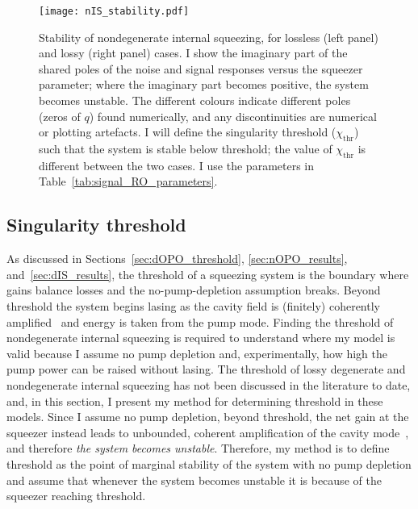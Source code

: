\begin{figure}[t]
    \centering
    \texttt{[image: nIS\_stability.pdf]}
    \caption{Stability of nondegenerate internal squeezing, for lossless (left panel) and lossy (right panel) cases. I show the imaginary part of the shared poles of the noise and signal responses versus the squeezer parameter; where the imaginary part becomes positive, the system becomes unstable. The different colours indicate different poles (zeros of $q$) found numerically, and any discontinuities are numerical or plotting artefacts. I will define the singularity threshold ($\chi_\text{thr}$) such that the system is stable below threshold; the value of $\chi_\text{thr}$ is different between the two cases. I use the parameters in Table~\ref{tab:signal_RO_parameters}.}
    \label{fig:nIS_stability}
\end{figure}


\subsection{Singularity threshold}
\label{sec:singularity_threshold}


As discussed in Sections~\ref{sec:dOPO_threshold}, \ref{sec:nOPO_results}, and~\ref{sec:dIS_results}, the threshold of a squeezing system is the boundary where gains balance losses and the no-pump-depletion assumption breaks. Beyond threshold the system begins lasing as the cavity field is (finitely) coherently amplified~\cite{martinelli2001classical} and energy is taken from the pump mode.
Finding the threshold of nondegenerate internal squeezing is required to understand where my model is valid because I assume no pump depletion and, experimentally, how high the pump power can be raised without lasing.
The threshold of lossy degenerate and nondegenerate internal squeezing has not been discussed in the literature to date, and, in this section, I present my method for determining threshold in these models. %
Since I assume no pump depletion, beyond threshold, the net gain at the squeezer instead leads to unbounded, coherent amplification of the cavity mode~\cite{walls_1995}, and therefore \emph{the system becomes unstable}. Therefore, my method is to define threshold as the point of marginal stability of the system with no pump depletion and assume that whenever the system becomes unstable it is because of the squeezer reaching threshold.

